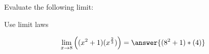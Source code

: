 \documentclass{ximera}
\author{Steven Gubkin}
\begin{document}
\begin{exercise}

		Evaluate the following limit:
	
	\begin{hint}
		Use limit laws
	\end{hint}
	\[
	\lim_{x \to 8} \left( (x^2+1)(x^{\frac{2}{3}}) \right) = \answer{(8^2+1)*(4)}
	\]
	
\end{exercise}
\end{document}

